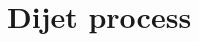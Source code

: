 \documentclass[11pt]{article}
\numberwithin{equation}{section}
\numberwithin{table}{section}
\numberwithin{figure}{section}
\begin{document}



\section{Dijet process}
\end{document}
